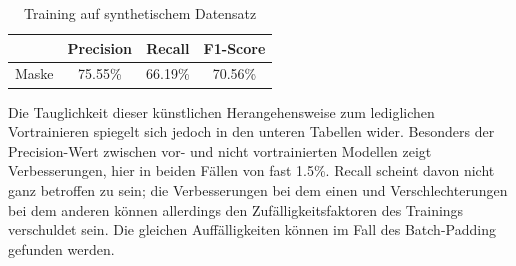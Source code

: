 \begin{table}[H]
    \centering
    \begin{minipage}{0.475\textwidth}
        \centering
        \begin{tabular}{|l|c|c|c|}
            \hline
            \rowcolor[HTML]{EFEFEF}
                  & Precision & Recall  & F1-Score \\ \hline
            Maske & 75.55\%   & 66.19\% & 70.56\%  \\ \hline
        \end{tabular}
        \caption{Training auf synthetischem Datensatz}
    \end{minipage}%
\end{table}

Die Tauglichkeit dieser künstlichen Herangehensweise zum lediglichen Vortrainieren spiegelt sich jedoch in den unteren Tabellen wider. Besonders der Precision-Wert zwischen vor- und nicht vortrainierten Modellen zeigt Verbesserungen, hier in beiden Fällen von fast 1.5\%. Recall scheint davon nicht ganz betroffen zu sein; die Verbesserungen bei dem einen und Verschlechterungen bei dem anderen können allerdings den Zufälligkeitsfaktoren des Trainings verschuldet sein. Die gleichen Auffälligkeiten können im Fall des Batch-Padding gefunden werden.

